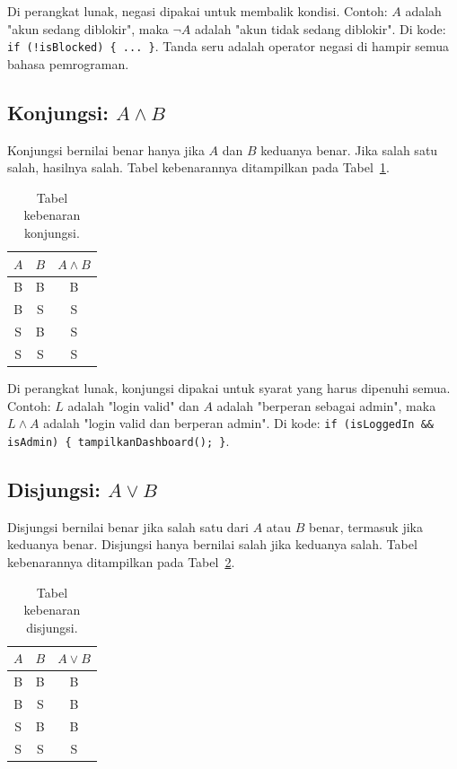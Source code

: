 \documentclass[11pt,a4paper]{article}
\begin{document}
Di perangkat lunak, negasi dipakai untuk membalik kondisi. Contoh: $A$ adalah "akun sedang diblokir", maka $\neg A$ adalah "akun tidak sedang diblokir". Di kode: \texttt{if (!isBlocked) \{ ... \}}. Tanda seru adalah operator negasi di hampir semua bahasa pemrograman.

\subsection{Konjungsi: $A \wedge B$}

Konjungsi bernilai benar hanya jika $A$ dan $B$ keduanya benar. Jika salah satu salah, hasilnya salah. Tabel kebenarannya ditampilkan pada Tabel~\ref{tab:konjungsi}.

\begin{table}[H]
	\centering
	\caption{Tabel kebenaran konjungsi.}
	\label{tab:konjungsi}
	\small
	\begin{tabular}{c c c}
		\toprule
		$A$ & $B$ & $A \wedge B$ \\
		\midrule
		B & B & B \\
		B & S & S \\
		S & B & S \\
		S & S & S \\
		\bottomrule
	\end{tabular}
\end{table}

Di perangkat lunak, konjungsi dipakai untuk syarat yang harus dipenuhi semua. Contoh: $L$ adalah "login valid" dan $A$ adalah "berperan sebagai admin", maka $L \wedge A$ adalah "login valid dan berperan admin". Di kode: \texttt{if (isLoggedIn \&\& isAdmin) \{ tampilkanDashboard(); \}}.

\subsection{Disjungsi: $A \vee B$}

Disjungsi bernilai benar jika salah satu dari $A$ atau $B$ benar, termasuk jika keduanya benar. Disjungsi hanya bernilai salah jika keduanya salah. Tabel kebenarannya ditampilkan pada Tabel~\ref{tab:disjungsi}.

\begin{table}[H]
	\centering
	\caption{Tabel kebenaran disjungsi.}
	\label{tab:disjungsi}
	\small
	\begin{tabular}{c c c}
		\toprule
		$A$ & $B$ & $A \vee B$ \\
		\midrule
		B & B & B \\
		B & S & B \\
		S & B & B \\
		S & S & S \\
		\bottomrule
	\end{tabular}
\end{table}
\end{document}
